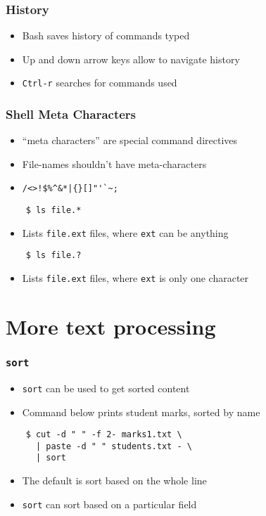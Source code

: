 \documentclass[12pt,compress]{beamer}
\begin{document}
\begin{frame}[fragile]
  \frametitle{History}
  \begin{itemize}
  \item Bash saves history of commands typed
  \item Up and down arrow keys allow to navigate history
  \item \texttt{Ctrl-r} searches for commands used
  \end{itemize}
\end{frame}

\begin{frame}[fragile]
  \frametitle{Shell Meta Characters}
  \begin{itemize}
  \item ``meta characters''  are special command directives
  \item File-names shouldn't have meta-characters
  \item   \verb+/<>!$%^&*|{}[]"'`~;+
  \end{itemize}
  \begin{lstlisting}
    $ ls file.*
  \end{lstlisting} %
  \begin{itemize}
  \item Lists \texttt{file.ext} files, where \texttt{ext} can be
    anything
  \end{itemize}
  \begin{lstlisting}
    $ ls file.?
  \end{lstlisting} %
  \begin{itemize}
  \item Lists \texttt{file.ext} files, where \texttt{ext} is only one
    character 
  \end{itemize}
\end{frame}

\section{More text processing}

\begin{frame}[fragile]
  \frametitle{\texttt{sort}}
  \begin{itemize}
  \item \texttt{sort} can be used to get sorted content
  \item Command below prints student marks, sorted by name
  \end{itemize}
  \begin{lstlisting}
    $ cut -d " " -f 2- marks1.txt \
      | paste -d " " students.txt - \
      | sort
  \end{lstlisting} %
  \begin{itemize}
  \item The default is sort based on the whole line
  \item \texttt{sort} can sort based on a particular field
  \end{itemize}
\end{frame}
\end{document}
